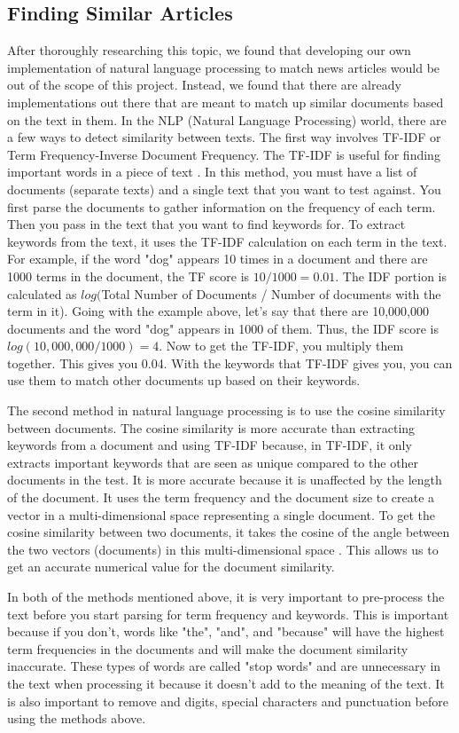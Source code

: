 \documentclass[onecolumn, draftclsnofoot,10pt, compsoc]{IEEEtran}
\begin{document}
\subsection{Finding Similar Articles}
After thoroughly researching this topic, we found that developing our own implementation of natural language processing to match news articles would be out of the scope of this project. Instead, we found that there are already implementations out there that are meant to match up similar documents based on the text in them. In the NLP (Natural Language Processing) world, there are a few ways to detect similarity between texts. The first way involves TF-IDF or Term Frequency-Inverse Document Frequency. The TF-IDF is useful for finding important words in a piece of text \cite{tfidf}. In this method, you must have a list of documents (separate texts) and a single text that you want to test against. You first parse the documents to gather information on the frequency of each term. Then you pass in the text that you want to find keywords for. To extract keywords from the text, it uses the TF-IDF calculation on each term in the text. For example, if the word "dog" appears 10 times in a document and there are 1000 terms in the document, the TF score is $10 / 1000=0.01$. The IDF portion is calculated as $log($Total Number of Documents / Number of documents with the term in it). Going with the example above, let's say that there are 10,000,000 documents and the word "dog" appears in 1000 of them. Thus, the IDF score is $log(10,000,000 / 1000)=4$. Now to get the TF-IDF, you multiply them together. This gives you 0.04. With the keywords that TF-IDF gives you, you can use them to match other documents up based on their keywords. \par
The second method in natural language processing is to use the cosine similarity between documents. The cosine similarity is more accurate than extracting keywords from a document and using TF-IDF because, in TF-IDF, it only extracts important keywords that are seen as unique compared to the other documents in the test. It is more accurate because it is unaffected by the length of the document. It uses the term frequency and the document size to create a vector in a multi-dimensional space representing a single document. To get the cosine similarity between two documents, it takes the cosine of the angle between the two vectors (documents) in this multi-dimensional space \cite{cosine_similarity}. This allows us to get an accurate numerical value for the document similarity.\par
In both of the methods mentioned above, it is very important to pre-process the text before you start parsing for term frequency and keywords. This is important because if you don't, words like "the", "and", and "because" will have the highest term frequencies in the documents and will make the document similarity inaccurate. These types of words are called "stop words" and are unnecessary in the text when processing it because it doesn't add to the meaning of the text. It is also important to remove and digits, special characters and punctuation before using the methods above. 
\end{document}

